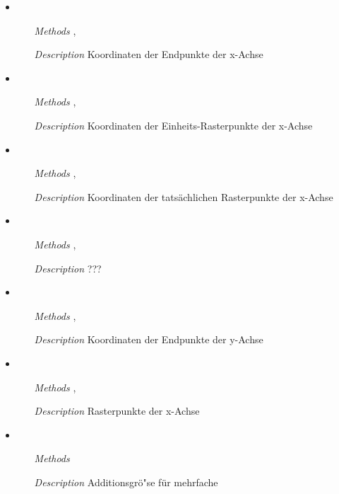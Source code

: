 \begin{itemize}
\item {}
\begin{enumerate}
\item[\textit{Methods}] ,
\item[\textit{Description}] Koordinaten der Endpunkte der x-Achse
\end{enumerate}

\item {}
\begin{enumerate}
\item[\textit{Methods}] ,
\item[\textit{Description}] Koordinaten der Einheits-Rasterpunkte der
  x-Achse
\end{enumerate}

\item {}
\begin{enumerate}
\item[\textit{Methods}] ,
\item[\textit{Description}] Koordinaten der tats\"achlichen
  Rasterpunkte der x-Achse
\end{enumerate}

\item {}
\begin{enumerate}
\item[\textit{Methods}] ,
\item[\textit{Description}] ???
\end{enumerate}

\item {}
\begin{enumerate}
\item[\textit{Methods}] ,
\item[\textit{Description}] Koordinaten der Endpunkte der y-Achse
\end{enumerate}

\item {}
\begin{enumerate}
\item[\textit{Methods}] ,
\item[\textit{Description}] Rasterpunkte der x-Achse
\end{enumerate}

\item {}
\begin{enumerate}
\item[\textit{Methods}] 
\item[\textit{Description}] Additionsgr\"o"se f\"ur mehrfache
\end{enumerate}

\end{itemize}

